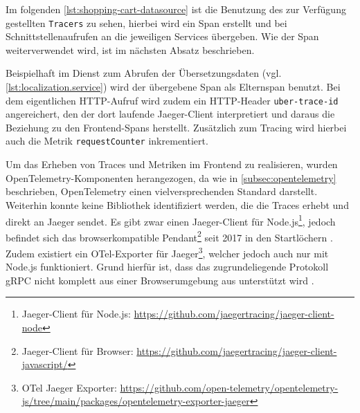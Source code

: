 

Im folgenden \autoref{lst:shopping-cart-datasource} ist die Benutzung des zur Verfügung gestellten \texttt{Tracers} zu sehen, hierbei wird ein Span erstellt und bei Schnittstellenaufrufen an die jeweiligen Services übergeben. Wie der Span weiterverwendet wird, ist im nächsten Absatz beschrieben.



Beispielhaft im Dienst zum Abrufen der Übersetzungsdaten (vgl. \autoref{lst:localization.service}) wird der übergebene Span als Elternspan benutzt. Bei dem eigentlichen HTTP-Aufruf wird zudem ein HTTP-Header \texttt{uber-trace-id} angereichert, den der dort laufende Jaeger-Client interpretiert \cite{JaegerClient} und daraus die Beziehung zu den Frontend-Spans herstellt. Zusätzlich zum Tracing wird hierbei auch die Metrik \texttt{requestCounter} inkrementiert.



Um das Erheben von Traces und Metriken im Frontend zu realisieren, wurden OpenTelemetry-Komponenten herangezogen, da wie in \autoref{subsec:opentelemetry} beschrieben, OpenTelemetry einen vielversprechenden Standard darstellt. Weiterhin konnte keine Bibliothek identifiziert werden, die die Traces erhebt und direkt an Jaeger sendet. Es gibt zwar einen Jaeger-Client für Node.js\footnote{Jaeger-Client für Node.js: \url{https://github.com/jaegertracing/jaeger-client-node}}, jedoch befindet sich das browserkompatible Pendant\footnote{Jaeger-Client für Browser: \url{https://github.com/jaegertracing/jaeger-client-javascript/}} seit 2017 in den Startlöchern \cite{JaegerJSClientUsageInABrowser}. Zudem existiert ein OTel-Exporter für Jaeger\footnote{OTel Jaeger Exporter: \url{https://github.com/open-telemetry/opentelemetry-js/tree/main/packages/opentelemetry-exporter-jaeger}}, welcher jedoch auch nur mit Node.js funktioniert. Grund hierfür ist, dass das zugrundeliegende Protokoll gRPC \cite{grpc} nicht komplett aus einer Browserumgebung aus unterstützt wird \cite{grpcWebLimitations}.

